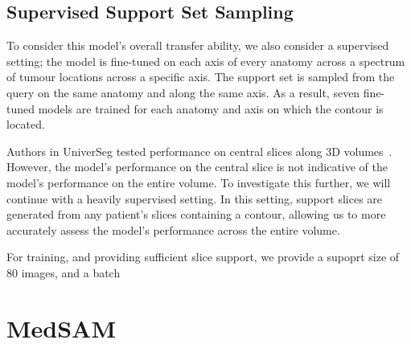 \documentclass[11pt,twoside]{report}
\begin{document}


\subsection{Supervised Support Set Sampling}

To consider this model's overall transfer ability, we also consider a supervised setting; the model is fine-tuned on each axis of every anatomy across a spectrum of tumour locations across a specific axis. The support set is sampled from the query on the same anatomy and along the same axis. As a result, seven fine-tuned models are trained for each anatomy and axis on which the contour is located.

Authors in UniverSeg tested performance on central slices along 3D volumes~\cite{universeg}. However, the model's performance on the central slice is not indicative of the model's performance on the entire volume. To investigate this further, we will continue with a heavily supervised setting. In this setting, support slices are generated from any patient's slices containing a contour, allowing us to more accurately assess the model's performance across the entire volume. 

For training, and providing sufficient slice support, we provide a supoprt size of 80 images, and a batch 


\section{MedSAM}
\end{document}
